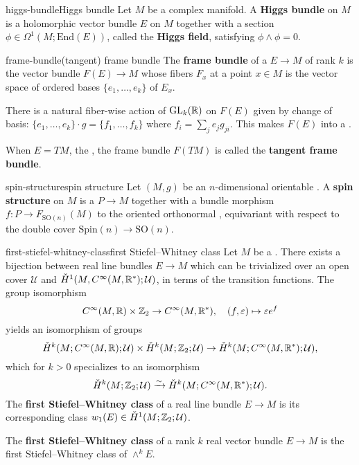 \begin{topic}{higgs-bundle}{Higgs bundle}
    Let $M$ be a complex manifold. A \textbf{Higgs bundle} on $M$ is a holomorphic vector bundle $E$ on $M$ together with a section $\phi \in \Omega^1(M; \text{End}(E))$, called the \textbf{Higgs field}, satisfying $\phi \wedge \phi = 0$.
\end{topic}

\begin{topic}{frame-bundle}{(tangent) frame bundle}
    The \textbf{frame bundle} of a  $E \to M$ of rank $k$ is the vector bundle $F(E) \to M$ whose fibers $F_x$ at a point $x \in M$ is the vector space of ordered bases $\{ e_1, \ldots, e_k \}$ of $E_x$.
    
    There is a natural fiber-wise action of $\text{GL}_k(\mathbb{R})$ on $F(E)$ given by change of basis: $\{ e_1, \ldots, e_k \} \cdot g = \{ f_1, \ldots, f_k \}$ where $f_i = \sum_j e_j g_{ji}$. This makes $F(E)$ into a .
    
    When $E = TM$, the , the frame bundle $F(TM)$ is called the \textbf{tangent frame bundle}.
\end{topic}

\begin{topic}{spin-structure}{spin structure}
    Let $(M, g)$ be an $n$-dimensional orientable . A \textbf{spin structure} on $M$ is a  $P \to M$ together with a bundle morphism $f : P \to F_{\text{SO}(n)}(M)$ to the oriented orthonormal , equivariant with respect to the double cover $\text{Spin}(n) \to \text{SO}(n)$.
\end{topic}

\begin{topic}{first-stiefel-whitney-class}{first Stiefel--Whitney class}
    Let $M$ be a . There exists a bijection between real line bundles $E \to M$ which can be trivialized over an open cover $\mathcal{U}$ and $\check{H}^1(M, C^\infty(M, \mathbb{R}^*); \mathcal{U})$, in terms of the transition functions. The group isomorphism
    \[ C^\infty(M, \mathbb{R}) \times \mathbb{Z}_2 \to C^\infty(M, \mathbb{R}^*), \quad (f, \varepsilon) \mapsto \varepsilon e^f \]
    yields an isomorphism of  groups
    \[ \check{H}^k(M; C^\infty(M, \mathbb{R}); \mathcal{U}) \times \check{H}^k(M; \mathbb{Z}_2; \mathcal{U}) \to \check{H}^k(M; C^\infty(M, \mathbb{R}^*); \mathcal{U}) , \]
    which for $k > 0$ specializes to an isomorphism
    \[ \check{H}^k(M; \mathbb{Z}_2; \mathcal{U}) \xrightarrow{\sim} \check{H}^k(M; C^\infty(M, \mathbb{R}^*); \mathcal{U}) . \]
    The \textbf{first Stiefel--Whitney class} of a real line bundle $E \to M$ is its corresponding class $w_1(E) \in \check{H}^1(M; \mathbb{Z}_2; \mathcal{U})$.
    
    The \textbf{first Stiefel--Whitney class} of a rank $k$ real vector bundle $E \to M$ is the first Stiefel--Whitney class of $\wedge^k E$.
\end{topic}

